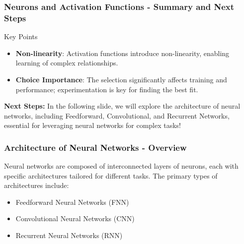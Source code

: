 \documentclass[aspectratio=169]{beamer}
\begin{document}
\begin{frame}[fragile]
    \frametitle{Neurons and Activation Functions - Summary and Next Steps}
    \begin{block}{Key Points}
        \begin{itemize}
            \item \textbf{Non-linearity}: Activation functions introduce non-linearity, enabling learning of complex relationships.
            \item \textbf{Choice Importance}: The selection significantly affects training and performance; experimentation is key for finding the best fit.
        \end{itemize}
    \end{block}
    
    \textbf{Next Steps:}  
    In the following slide, we will explore the architecture of neural networks, including Feedforward, Convolutional, and Recurrent Networks, essential for leveraging neural networks for complex tasks!
\end{frame}

\begin{frame}[fragile]
  \frametitle{Architecture of Neural Networks - Overview}
  
  Neural networks are composed of interconnected layers of neurons, each with specific architectures tailored for different tasks. The primary types of architectures include:
  
  \begin{itemize}
    \item Feedforward Neural Networks (FNN)
    \item Convolutional Neural Networks (CNN)
    \item Recurrent Neural Networks (RNN)
  \end{itemize}

\end{frame}
\end{document}
